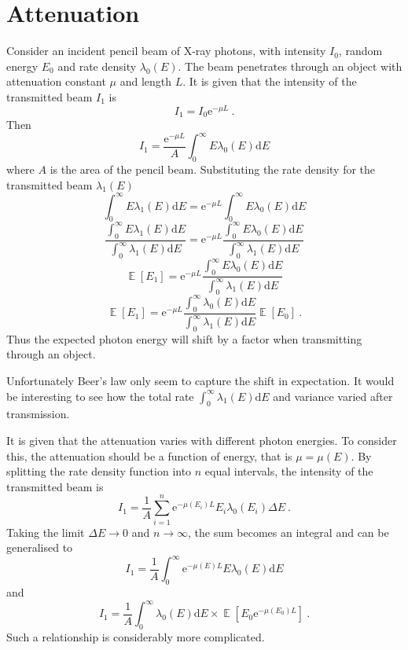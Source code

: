 \documentclass[12pt]{report}
\DeclareMathOperator{\expectation}{\mathbb{E}}
\newcommand{\euler}{\mathrm{e}}
\newcommand{\diff}{\mathrm{d}}
\begin{document}
\section{Attenuation}
Consider an incident pencil beam of X-ray photons, with intensity $I_0$, random energy $E_0$ and rate density $\lambda_0(E)$. The beam penetrates through an object with attenuation constant $\mu$ and length $L$. It is given that the intensity of the transmitted beam $I_1$ is
\begin{equation}
I_1 = I_0 \euler^{-\mu L} \ .
\end{equation}
Then
\begin{equation}
I_1 = \frac{\euler^{-\mu L}}{A}\int_{0}^{\infty}E\lambda_0(E)\diff E
\end{equation}
where $A$ is the area of the pencil beam. Substituting the rate density for the transmitted beam $\lambda_1(E)$
\begin{equation}
\int_{0}^{\infty}E\lambda_1(E)\diff E = \euler^{-\mu L}\int_{0}^{\infty}E\lambda_0(E)\diff E
\end{equation}
\begin{equation}
\frac{\int_{0}^{\infty}E\lambda_1(E)\diff E}{\int_{0}^{\infty}\lambda_1(E)\diff E}= \euler^{-\mu L}\frac{\int_{0}^{\infty}E\lambda_0(E)\diff E}{\int_{0}^{\infty}\lambda_1(E)\diff E}
\end{equation}
\begin{equation}
\expectation[E_1]= \euler^{-\mu L}\frac{\int_{0}^{\infty}E\lambda_0(E)\diff E}{\int_{0}^{\infty}\lambda_1(E)\diff E}
\end{equation}
\begin{equation}
\expectation[E_1]= \euler^{-\mu L}\frac{\int_{0}^{\infty}\lambda_0(E)\diff E}{\int_{0}^{\infty}\lambda_1(E)\diff E}\expectation[E_0] \ .
\end{equation}
Thus the expected photon energy will shift by a factor when transmitting through an object.

Unfortunately Beer's law only seem to capture the shift in expectation. It would be interesting to see how the total rate $\int_{0}^{\infty}\lambda_1(E)\diff E$ and variance varied after transmission.

It is given that the attenuation varies with different photon energies. To consider this, the attenuation should be a function of energy, that is $\mu=\mu(E)$. By splitting the rate density function into $n$ equal intervals, the intensity of the transmitted beam is
\begin{equation}
I_1=\frac{1}{A}\sum_{i=1}^n\euler^{-\mu(E_i)L}E_i\lambda_0(E_i)\Delta E \ .
\end{equation}
Taking the limit $\Delta E\rightarrow0$ and $n\rightarrow\infty$, the sum becomes an integral and can be generalised to
\begin{equation}
I_1=\frac{1}{A}\int_0^{\infty}\euler^{-\mu(E)L}E\lambda_0(E)\diff E
\end{equation}
and
\begin{equation}
I_1=\frac{1}{A}\int_0^{\infty}\lambda_0(E)\diff E \times \expectation\left[E_0\euler^{-\mu(E_0)L}\right] \ .
\end{equation}
Such a relationship is considerably more complicated.
\end{document}

